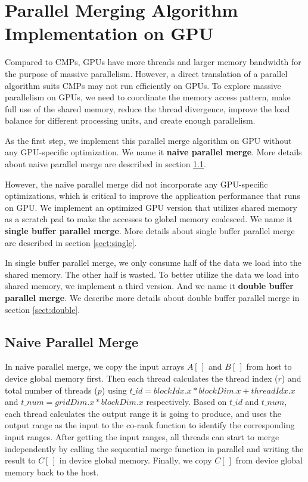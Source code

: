 \chapter{Parallel Merging Algorithm Implementation on GPU}\label{chap:implementation}
Compared to CMPs, GPUs have more threads and larger memory bandwidth 
for the purpose of massive parallelism. 
However, a direct translation of a parallel algorithm suits CMPs
may not run efficiently on GPUs. 
To explore massive parallelism on GPUs, we need to coordinate 
the memory access pattern, make full use of the shared memory, reduce the thread 
divergence, improve the load balance for different processing units, and create enough 
parallelism.

As the first step, we implement this parallel merge algorithm on GPU without any 
GPU-specific optimization. We 
name it \textbf{naive parallel merge}. More details about naive parallel merge 
are described in section \ref{sect:naive}. 

However, the naive parallel merge did not incorporate any GPU-specific optimizations, 
which is critical to improve the application performance that runs on GPU.  
We implement an optimized GPU version that utilizes shared memory as a scratch pad to make the 
accesses to global memory coalesced. We name it \textbf{single buffer 
parallel merge}. More details about single buffer parallel merge are described in section 
\ref{sect:single}. 

In single buffer parallel merge, we only consume half of the 
data we load into the shared memory. The other half is wasted. 
To better utilize the data we load into shared memory, we implement a third version. And we 
name it \textbf{double buffer parallel merge}. We describe more details about double buffer 
parallel merge in section \ref{sect:double}.

%   
%
    \section{Naive Parallel Merge}\label{sect:naive}
    In naive parallel merge, we copy the input arrays $A[\,]$ and $B[\,]$ from host to device global 
    memory first.
    Then each thread calculates the thread index ($r$) and total number of threads ($p$) 
    using $t\_id = blockIdx.x * blockDim.x + threadIdx.x$ and $t\_num = gridDim.x * blockDim.x$ 
    respectively. Based on $t\_id$ and $t\_num$, each thread calculates the output range it is 
    going to produce, and uses the output range as the input to the co-rank function to identify the 
    corresponding input ranges. After getting the input ranges, all threads can start to merge 
    independently by calling the sequential merge function in parallel and writing the result
    to $C[\,]$ in device global memory. Finally, we copy $C[\,]$ from device global memory back to the host.

